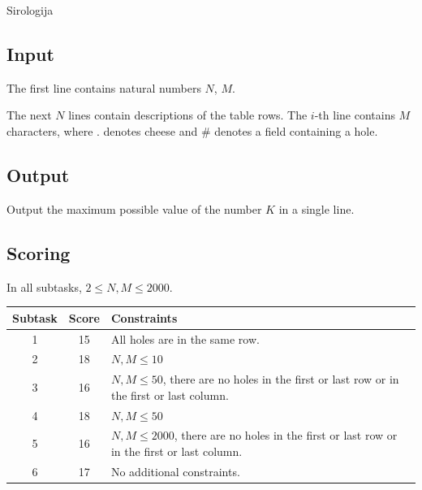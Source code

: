 \begin{statement}[
  problempoints=100,
  timelimit=1 second,
  memorylimit=1024 MiB,
]{Sirologija}
\begin{figure}[!h]
\begin{subfigure}{0.49\linewidth}
    \end{subfigure}

  \end{figure}

\subsection*{Input}

The first line contains natural numbers $N$, $M$.

The next $N$ lines contain descriptions of the table rows. The $i$-th line contains $M$ characters, where $\texttt{.}$ denotes cheese and $\texttt{\#}$ denotes a field containing a hole.

\subsection*{Output}

Output the maximum possible value of the number $K$ in a single line.

\subsection*{Scoring}

In all subtasks, $2 \leq N, M \leq 2000$.

{\renewcommand{\arraystretch}{1.4}
  \setlength{\tabcolsep}{6pt}
  \begin{tabular}{ccl}
   Subtask & Score & Constraints \\ \midrule
    1 & 15 & All holes are in the same row. \\
    2 & 18 & $N, M \leq 10$ \\
    3 & 16 & $N, M \leq 50$, there are no holes in the first or last row or in the first or last column.\\
    4 & 18 & $N, M \leq 50$ \\
    5 & 16 & $N, M \leq 2000$, there are no holes in the first or last row or in the first or last column.\\
    6 & 17 & No additional constraints. \\
\end{tabular}}


\end{statement}
